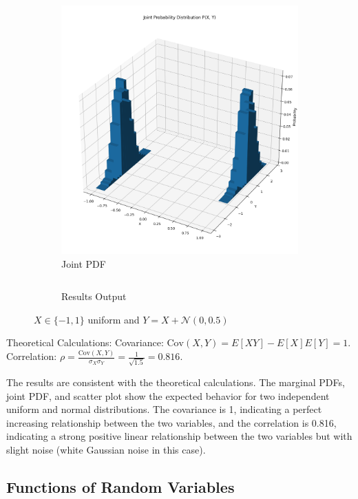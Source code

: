 \documentclass{article}
\begin{document}
\begin{figure}[H]
\begin{subfigure}{0.45\textwidth}
    \includegraphics[width=\linewidth]{results/section2/e(2).png}
    \caption{Joint PDF}
  \end{subfigure}

  \begin{subfigure}{\textwidth}
    \inputminted{text}{results/section2/e.txt}
    \caption{Results Output}
  \end{subfigure}
  \caption{$X \in \{-1,1\}$ uniform and $Y = X + \mathcal{N}(0, 0.5)$}
\end{figure}
Theoretical Calculations:
Covariance: $\text{Cov}(X,Y) = E[XY] - E[X]E[Y] = 1$.
Correlation: $\rho = \frac{\text{Cov}(X,Y)}{\sigma_X\sigma_Y} = \frac{1}{\sqrt{1.5} }=0.816$.

The results are consistent with the theoretical calculations. The marginal PDFs, joint PDF, and scatter plot show the expected behavior for two independent uniform and normal distributions. The covariance is 1, indicating a perfect increasing relationship between the two variables, and the correlation is 0.816, indicating a strong positive linear relationship between the two variables but with slight noise (white Gaussian noise in this case).

\newpage

\subsection{Functions of Random Variables}
\end{document}

